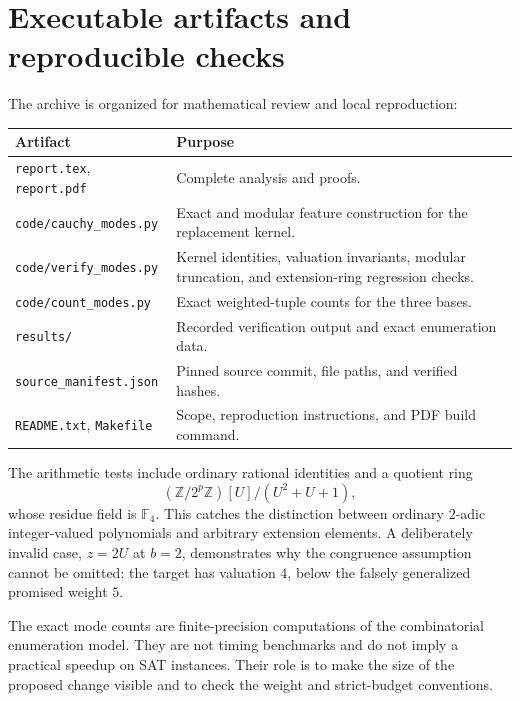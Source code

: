 \documentclass[11pt]{article}
\theoremstyle{remark}
\begin{document}
\section{Executable artifacts and reproducible checks}\label{sec:validation}

The archive is organized for mathematical review and local reproduction:
\begin{center}
\begin{tabular}{@{}p{}p{}@{}}
\toprule
Artifact & Purpose\\
\midrule
\texttt{report.tex}, \texttt{report.pdf} & Complete analysis and proofs.\\
\texttt{code/cauchy\_modes.py} & Exact and modular feature construction for the replacement kernel.\\
\texttt{code/verify\_modes.py} & Kernel identities, valuation invariants, modular truncation, and extension-ring regression checks.\\
\texttt{code/count\_modes.py} & Exact weighted-tuple counts for the three bases.\\
\texttt{results/} & Recorded verification output and exact enumeration data.\\
\texttt{source\_manifest.json} & Pinned source commit, file paths, and verified hashes.\\
\texttt{README.txt}, \texttt{Makefile} & Scope, reproduction instructions, and PDF build command.\\
\bottomrule
\end{tabular}
\end{center}

The arithmetic tests include ordinary rational identities and a quotient ring
\[
 (\mathbb Z/2^p\mathbb Z)[U]/(U^2+U+1),
\]
whose residue field is $\mathbb F_4$. This catches the distinction between ordinary $2$-adic integer-valued polynomials and arbitrary extension elements. A deliberately invalid case, $z=2U$ at $b=2$, demonstrates why the congruence assumption cannot be omitted: the target has valuation $4$, below the falsely generalized promised weight $5$.

The exact mode counts are finite-precision computations of the combinatorial enumeration model. They are not timing benchmarks and do not imply a practical speedup on SAT instances. Their role is to make the size of the proposed change visible and to check the weight and strict-budget conventions.



\end{document}
